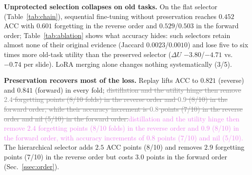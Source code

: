 \documentclass{article}
\newif\ifmarkup \markuptrue
\newcommand{\repc}[3]{\ifmarkup\textcolor{gray}{\sout{#2}}\textcolor{#1}{#3}\else#3\fi}
\newcommand{\repP}[2]{\repc{violet}{#1}{#2}}  %
\begin{document}
\textbf{Unprotected selection collapses on old tasks.} On the flat selector (Table~\ref{tab:chain}), sequential fine-tuning without preservation reaches $0.452$ ACC with $0.601$ forgetting in the reverse order and $0.529$/$0.503$ in the forward order; Table~\ref{tab:ablation} shows what accuracy hides: such selectors retain almost none of their original evidence (Jaccard $0.0023$/$0.0010$) and lose five to six times more old-task utility than the preserved selector ($\Delta U$ $-3.80$/$-4.71$ vs.\ $-0.74$ per slide). LoRA merging alone changes nothing systematically (3/5).

\textbf{Preservation recovers most of the loss.} Replay lifts ACC to $0.821$ (reverse) and $0.841$ (forward) in every fold; \repP{distillation and the utility hinge then remove $2.4$ forgetting points (8/10 folds) in the reverse order and $0.9$ (8/10) in the forward order, while their accuracy increment is $0.8$ points (7/10) in the reverse order and nil (5/10) in the forward order.}{distillation and the utility hinge then remove $2.4$ forgetting points (8/10 folds) in the reverse order and $0.9$ (8/10) in the forward order, with accuracy increments of $0.8$ points (7/10) and nil (5/10).} The hierarchical selector adds $2.5$ ACC points (8/10) and removes $2.9$ forgetting points (7/10) in the reverse order but costs $3.0$ points in the forward order (Sec.~\ref{ssec:order}).
\end{document}
